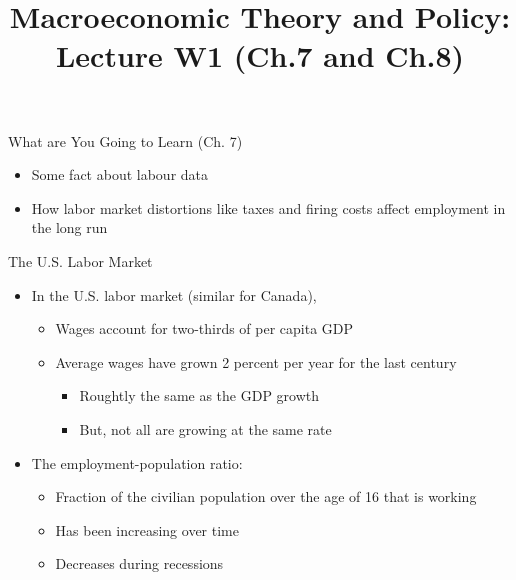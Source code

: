 \documentclass[aspectratio=1610]{beamer}
\title[Winter - Lecture 1] %
{Macroeconomic Theory and Policy: Lecture  W1 (Ch.7 and Ch.8)}
\author[University of Toronto] %
{}
\date[] %
\begin{document}
\begin{frame}
  \titlepage
\end{frame}

\begin{frame}[wide]{What are You Going to Learn (Ch. 7)}
	\begin{itemize}
		\item Some fact about labour data
		\item How labor market distortions like taxes and ﬁring costs affect employment in the long run
	\end{itemize}
\end{frame}

\begin{frame}[wide]{The U.S. Labor Market}
	\begin{itemize}
		\item In the U.S. labor market (similar for Canada),
		\begin{itemize}
			\item Wages account for two-thirds of per capita GDP
			\item Average wages have grown 2 percent per year for the last century 
			\begin{itemize}
				\item Roughtly the same as the GDP growth
				\item But, not all are growing at the same rate
			\end{itemize}
		\end{itemize}
		\vspace{2mm}
		\item The employment-population ratio:
		\begin{itemize}
			\item Fraction of the civilian population over the age of 16 that is working
			\item Has been increasing over time
			\item Decreases during recessions
			
		\end{itemize}
	\end{itemize}
\end{frame}
\end{document}
